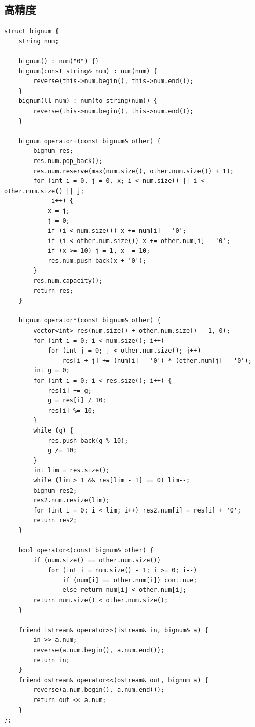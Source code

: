 \documentclass[UTF8]{ctexart}
\begin{document}
\begin{sloppypar}
\subsection{高精度}

\begin{lstlisting}[style=cpp]
struct bignum {
    string num;

    bignum() : num("0") {}
    bignum(const string& num) : num(num) {
        reverse(this->num.begin(), this->num.end());
    }
    bignum(ll num) : num(to_string(num)) {
        reverse(this->num.begin(), this->num.end());
    }

    bignum operator+(const bignum& other) {
        bignum res;
        res.num.pop_back();
        res.num.reserve(max(num.size(), other.num.size()) + 1);
        for (int i = 0, j = 0, x; i < num.size() || i < other.num.size() || j;
             i++) {
            x = j;
            j = 0;
            if (i < num.size()) x += num[i] - '0';
            if (i < other.num.size()) x += other.num[i] - '0';
            if (x >= 10) j = 1, x -= 10;
            res.num.push_back(x + '0');
        }
        res.num.capacity();
        return res;
    }

    bignum operator*(const bignum& other) {
        vector<int> res(num.size() + other.num.size() - 1, 0);
        for (int i = 0; i < num.size(); i++)
            for (int j = 0; j < other.num.size(); j++)
                res[i + j] += (num[i] - '0') * (other.num[j] - '0');
        int g = 0;
        for (int i = 0; i < res.size(); i++) {
            res[i] += g;
            g = res[i] / 10;
            res[i] %= 10;
        }
        while (g) {
            res.push_back(g % 10);
            g /= 10;
        }
        int lim = res.size();
        while (lim > 1 && res[lim - 1] == 0) lim--;
        bignum res2;
        res2.num.resize(lim);
        for (int i = 0; i < lim; i++) res2.num[i] = res[i] + '0';
        return res2;
    }

    bool operator<(const bignum& other) {
        if (num.size() == other.num.size())
            for (int i = num.size() - 1; i >= 0; i--)
                if (num[i] == other.num[i]) continue;
                else return num[i] < other.num[i];
        return num.size() < other.num.size();
    }

    friend istream& operator>>(istream& in, bignum& a) {
        in >> a.num;
        reverse(a.num.begin(), a.num.end());
        return in;
    }
    friend ostream& operator<<(ostream& out, bignum a) {
        reverse(a.num.begin(), a.num.end());
        return out << a.num;
    }
};
\end{lstlisting}


\end{sloppypar}
\end{document}

